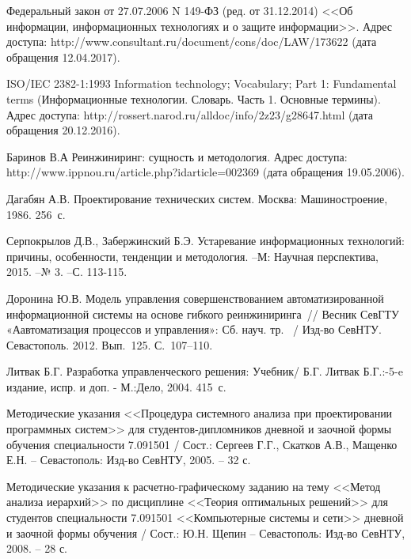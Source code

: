 \begingroup
\renewcommand{\section}[2]{\anonsection{Библиографический список}}
\begin{thebibliography}{00}

 Федеральный закон от 27.07.2006 N 149-ФЗ (ред. от 31.12.2014) <<Об информации, информационных технологиях и о защите информации>>.
Адрес доступа: http://www.consultant.ru/document/cons/doc/LAW/173622 (дата обращения 12.04.2017).

 ISO/IEC 2382-1:1993 Information technology; Vocabulary; Part 1: Fundamental terms (Информационные технологии. Словарь. Часть 1. Основные термины).
Адрес доступа: http://rossert.narod.ru/alldoc/info/2z23/g28647.html (дата обращения 20.12.2016).

Баринов В.А Реинжиниринг: сущность и методология. 
Адрес доступа: http://www.ippnou.ru/article.php?idarticle=002369 (дата обращения 19.05.2006).

Дагабян А.В. Проектирование технических систем. 
Москва: Машиностроение, 1986. 256~с.

\bibitem{}
Серпокрылов Д.В., Забержинский Б.Э.
Устаревание информационных технологий: причины, особенности, тенденции и методология.
--М: Научная перспектива, 2015. --№ 3. --С. 113-115. 

Доронина Ю.В. Модель управления совершенствованием автоматизированной информационной системы на основе гибкого реинжиниринга~//
 Весник СевГТУ «Аавтоматизация процессов и управления»: Сб. науч. тр. ~/ Изд-во СевНТУ. Севастополь. 2012. Вып.~125. С.~107--110.

Литвак Б.Г. Разработка управленческого решения: Учебник/ 
Б.Г. Литвак Б.Г.:-5-e издание, испр. и доп. - М.:Дело, 2004. 415~с.

    Методические указания <<Процедура системного анализа при проектировании программных систем>>
    для студентов-дипломников дневной и заочной формы  обучения специальности 7.091501 /
    Сост.: Сергеев Г.Г., Скатков А.В., Мащенко Е.Н. -- Севастополь:
    Изд-во СевНТУ, 2005. -- 32 с.

    Методические указания к расчетно-графическому заданию
    на тему <<Метод анализа иерархий>>  по дисциплине <<Теория оптимальных решений>>
    для студентов специальности 7.091501 <<Компьютерные системы и сети>>
    дневной и заочной формы обучения /
    Сост.: Ю.Н. Щепин -- Севастополь:
    Изд-во СевНТУ, 2008. -- 28 с.


\end{thebibliography}
